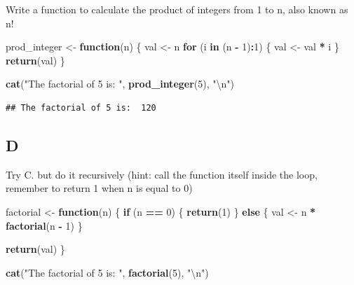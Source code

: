 \documentclass[
]{article}
\newenvironment{Shaded}{\begin{snugshade}}{\end{snugshade}}
\newcommand{\CharTok}[1]{\textcolor[rgb]{0.31,0.60,0.02}{#1}}
\newcommand{\ControlFlowTok}[1]{\textcolor[rgb]{0.13,0.29,0.53}{\textbf{#1}}}
\newcommand{\DecValTok}[1]{\textcolor[rgb]{0.00,0.00,0.81}{#1}}
\newcommand{\KeywordTok}[1]{\textcolor[rgb]{0.13,0.29,0.53}{\textbf{#1}}}
\newcommand{\NormalTok}[1]{#1}
\newcommand{\OperatorTok}[1]{\textcolor[rgb]{0.81,0.36,0.00}{\textbf{#1}}}
\newcommand{\StringTok}[1]{\textcolor[rgb]{0.31,0.60,0.02}{#1}}
\begin{document}
Write a function to calculate the product of integers from 1 to n, also
known as n!

\begin{Shaded}
\begin{Highlighting}[]
\NormalTok{prod\_integer \textless{}{-}}\StringTok{ }\ControlFlowTok{function}\NormalTok{(n) \{}
\NormalTok{  val \textless{}{-}}\StringTok{ }\NormalTok{n}
  \ControlFlowTok{for}\NormalTok{ (i }\ControlFlowTok{in}\NormalTok{ (n }\OperatorTok{{-}}\StringTok{ }\DecValTok{1}\NormalTok{)}\OperatorTok{:}\DecValTok{1}\NormalTok{) \{}
\NormalTok{    val \textless{}{-}}\StringTok{ }\NormalTok{val }\OperatorTok{*}\StringTok{ }\NormalTok{i}
\NormalTok{  \}}
  \KeywordTok{return}\NormalTok{(val)}
\NormalTok{\}}

\KeywordTok{cat}\NormalTok{(}\StringTok{"The factorial of 5 is: "}\NormalTok{, }\KeywordTok{prod\_integer}\NormalTok{(}\DecValTok{5}\NormalTok{), }\StringTok{"}\CharTok{\textbackslash{}n}\StringTok{"}\NormalTok{)}
\end{Highlighting}
\end{Shaded}

\begin{verbatim}
## The factorial of 5 is:  120
\end{verbatim}

\hypertarget{d}{%
\subsection{D}\label{d}}

Try C. but do it recursively (hint: call the function itself inside the
loop, remember to return 1 when n is equal to 0)

\begin{Shaded}
\begin{Highlighting}[]
\NormalTok{factorial \textless{}{-}}\StringTok{ }\ControlFlowTok{function}\NormalTok{(n) \{}
  \ControlFlowTok{if}\NormalTok{ (n }\OperatorTok{==}\StringTok{ }\DecValTok{0}\NormalTok{) \{}
    \KeywordTok{return}\NormalTok{(}\DecValTok{1}\NormalTok{)}
\NormalTok{  \} }\ControlFlowTok{else}\NormalTok{ \{}
\NormalTok{    val \textless{}{-}}\StringTok{ }\NormalTok{n }\OperatorTok{*}\StringTok{ }\KeywordTok{factorial}\NormalTok{(n }\OperatorTok{{-}}\StringTok{ }\DecValTok{1}\NormalTok{)}
\NormalTok{  \}}

  \KeywordTok{return}\NormalTok{(val)}
\NormalTok{\}}

\KeywordTok{cat}\NormalTok{(}\StringTok{"The factorial of 5 is: "}\NormalTok{, }\KeywordTok{factorial}\NormalTok{(}\DecValTok{5}\NormalTok{), }\StringTok{"}\CharTok{\textbackslash{}n}\StringTok{"}\NormalTok{)}
\end{Highlighting}
\end{Shaded}
\end{document}
